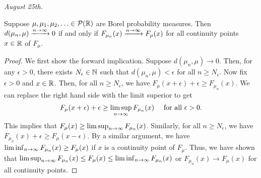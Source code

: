 \textit{August 25th.}

\begin{theorem}
    Suppose $\mu,\mu_{1},\mu_{2},\ldots \in \mathcal{P}(\mathbb{R})$ are Borel probability measures. Then $d(\mu_{n},\mu) \xrightarrow{n \to \infty} 0$ if and only if $F_{\mu_{n}}(x) \xrightarrow{n \to \infty} F_{\mu}(x)$ for all continuity points $x \in \mathbb{R}$ of $F_{\mu}$.
\end{theorem}
\begin{proof}
    We first show the forward implication. Suppose $d(\mu_{n},\mu) \to 0$. Then, for any $\epsilon > 0$, there exists $N_{\epsilon} \in \mathbb{N}$ such that $d(\mu_{n},\mu) < \epsilon$ for all $n \geq N_{\epsilon}$. Now fix $\epsilon > 0$ and $x \in \mathbb{R}$. Then, for all $n \geq N_{\epsilon}$, we have $F_{\mu}(x+\epsilon) + \epsilon \geq F_{\mu_{n}}(x)$. We can replace the right hand side with the limit superior to get
    \begin{align}
        F_{\mu}(x+\epsilon) + \epsilon \geq \limsup_{n \to \infty} F_{\mu_{n}}(x) \quad \text{ for all } \epsilon > 0.
    \end{align}
    This implies that $F_{\mu}(x) \geq \limsup_{n \to \infty} F_{\mu_{n}}(x)$. Similarly, for all $n \geq N_{\epsilon}$, we have $F_{\mu_{n}}(x) + \epsilon \geq F_{\mu}(x-\epsilon)$. By a similar argument, we have $\liminf_{n \to \infty} F_{\mu_{n}}(x) \geq F_{\mu}(x)$ if $x$ is a continuity point of $F_{\mu}$. Thus, we have shown that $\limsup_{n \to \infty} F_{\mu_{n}}(x) \leq F_{\mu}(x) \leq \liminf_{n \to \infty} F_{\mu_{n}}(x)$ or $F_{\mu_{n}}(x) \to F_{\mu}(x)$ for all continuity points.


\end{proof}
